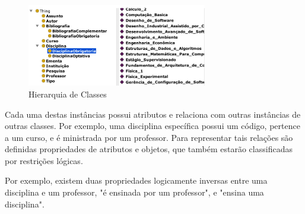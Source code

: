 \begin{figure}[H]
	\centering
	\includegraphics[width=0.7\textwidth]{imagens/hierarquia2}
	\caption{Hierarquia de Classes}
	\label{img:hierarquia4}
\end{figure}

Cada uma destas instâncias possui atributos e relaciona com outras instâncias de outras classes. Por exemplo, uma disciplina específica possui um código, pertence a um curso, e é ministrada por um professor. Para representar tais relações são definidas propriedades de atributos e objetos, que também estarão classificadas por restrições lógicas.
	
	Por exemplo, existem duas propriedades logicamente inversas entre uma disciplina e um professor, "é ensinada por um professor", e "ensina uma disciplina".

